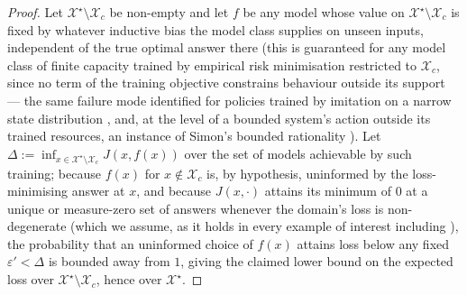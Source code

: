 \documentclass[11pt,twocolumn,a4paper]{article}
\theoremstyle{rdm}
\theoremstyle{definition}
\theoremstyle{remark}
\newcommand{\Cands}{\mathcal{X}}
\newcommand{\eps}{\varepsilon}
\begin{document}
\begin{proof}
Let $\Cands^\star\setminus\Cands_c$ be non-empty and let $f$ be any model
whose value on $\Cands^\star\setminus\Cands_c$ is fixed by whatever
inductive bias the model class supplies on unseen inputs, independent of the
true optimal answer there (this is guaranteed for any model class of finite
capacity trained by empirical risk minimisation restricted to $\Cands_c$,
since no term of the training objective constrains behaviour outside its
support --- the same failure mode identified for policies trained by
imitation on a narrow state distribution \citep{ross2011}, and, at the level
of a bounded system's action outside its trained resources, an instance of
Simon's bounded rationality \citep{simon1956,simon1957}). Let $\Delta := \inf_{x\in\Cands^\star\setminus\Cands_c}
J(x,f(x))$ over the set of models achievable by such training; because
$f(x)$ for $x \notin \Cands_c$ is, by hypothesis, uninformed by the
loss-minimising answer at $x$, and because $J(x,\cdot)$ attains its minimum
of $0$ at a unique or measure-zero set of answers whenever the domain's loss
is non-degenerate (which we assume, as it holds in every example of interest
including ), the probability that an uninformed choice
of $f(x)$ attains loss below any fixed $\eps' < \Delta$ is bounded away from
$1$, giving the claimed lower bound on the expected loss over
$\Cands^\star\setminus\Cands_c$, hence over $\Cands^\star$.
\end{proof}
\end{document}
